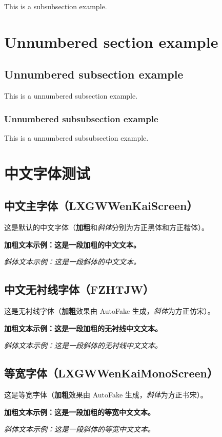\documentclass[fontset=none]{ctexart}
\begin{document}
This is a subsubsection example.

\section*{Unnumbered section example}

\subsection*{Unnumbered subsection example}

This is a unnumbered subsection example.

\subsubsection*{Unnumbered subsubsection example}

This is a unnumbered subsubsection example.

\section{中文字体测试}

\subsection{中文主字体（LXGWWenKaiScreen）}
这是默认的中文字体（\textbf{加粗}和\textit{斜体}分别为方正黑体和方正楷体）。  
\par
\textbf{加粗文本示例：这是一段加粗的中文文本。}
\par
\textit{斜体文本示例：这是一段斜体的中文文本。}

\subsection{中文无衬线字体（FZHTJW）}
{\sffamily
这是无衬线字体（\textbf{加粗}效果由 AutoFake 生成，\textit{斜体}为方正仿宋）。  
\par
\textbf{加粗文本示例：这是一段加粗的无衬线中文文本。}
\par
\textit{斜体文本示例：这是一段斜体的无衬线中文文本。}
}

\subsection{等宽字体（LXGWWenKaiMonoScreen）}
{\ttfamily
这是等宽字体（\textbf{加粗}效果由 AutoFake 生成，\textit{斜体}为方正书宋）。  
\par
\textbf{加粗文本示例：这是一段加粗的等宽中文文本。}
\par
\textit{斜体文本示例：这是一段斜体的等宽中文文本。}
}
\end{document}
